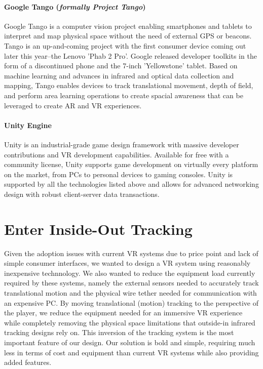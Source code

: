 \documentclass{report}
\begin{document}
	\paragraph*{Google Tango (\textit{formally Project Tango})}
	Google Tango is a computer vision project enabling smartphones and tablets to interpret and map physical space without the need of external GPS or beacons. Tango is an up-and-coming project with the first consumer device coming out later this year--the Lenovo 'Phab 2 Pro'. Google released developer toolkits in the form of a discontinued phone and the 7-inch 'Yellowstone' tablet. Based on machine learning and advances in infrared and optical data collection and mapping, Tango enables devices to track translational movement, depth of field, and perform area learning operations to create spacial awareness that can be leveraged to create AR and VR experiences.
	
	\paragraph*{Unity Engine}
	Unity is an industrial-grade game design framework with massive developer contributions and VR development capabilities. Available for free with a community license, Unity supports game development on virtually every platform on the market, from PCs to personal devices to gaming consoles. Unity is supported by all the technologies listed above and allows for advanced networking design with robust client-server data transactions.
	
	\section*{Enter Inside-Out Tracking}
	Given the adoption issues with current VR systems due to price point and lack of simple consumer interfaces, we wanted to design a VR system using reasonably inexpensive technnology. We also wanted to reduce the equipment load currently required by these systems, namely the external sensors needed to accurately track translational motion and the physical wire tether needed for communication with an expensive PC. By moving translational (motion) tracking to the perspective of the player, we reduce the equipment needed for an immersive VR experience while completely removing the physical space limitations that outside-in infrared tracking designs rely on. This inversion of the tracking system is the most important feature of our design.  Our solution is bold and simple, requiring much less in terms of cost and equipment than current VR systems while also providing added features.
	
\end{document}
